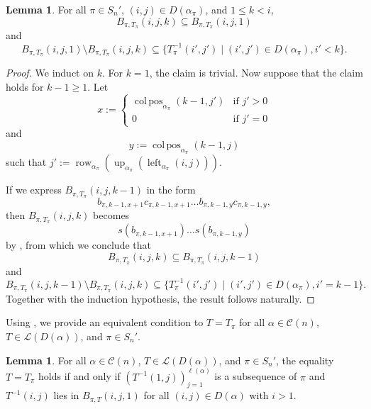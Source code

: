 \documentclass[12pt]{amsart}
\DeclareMathOperator{\colpos}{col\,pos}
\DeclareMathOperator{\leftof}{left}
\DeclareMathOperator{\row}{row}
\DeclareMathOperator{\upof}{up}
\theoremstyle{definition}
\newtheorem{lemma}[theorem]{Lemma}
\begin{document}
\begin{lemma}\label{lem:generalizedblockstuff}
For all $\pi\in S_n'$, $(i,j)\in D(\alpha_{\pi})$, and $1\le k<i$, 
\[B_{\pi,T_{\pi}}(i,j,k) \subseteq B_{\pi,T_{\pi}}(i,j,1)\]
and
\[B_{\pi,T_{\pi}}(i,j,1) \setminus B_{\pi,T_{\pi}}(i,j,k)\subseteq \{T_{\pi}^{-1}(i',j')\mid (i',j')\in D(\alpha_{\pi}), i'<k\}.\]
\end{lemma}
\begin{proof}
We induct on $k$. For $k=1$, the claim is trivial. Now suppose that the claim holds for $k-1\ge 1$. Let 
\[x := \begin{cases}\colpos_{\alpha_{\pi}}(k-1,j') &\text{if } j'>0 \\ 0 &\text{if } j'=0\end{cases}\]
and
\[y := \colpos_{\alpha_{\pi}}(k-1,j)\]
such that $j':=\row_{\alpha_{\pi}}(\upof_{\alpha_{\pi}}(\leftof_{\alpha_{\pi}}(i,j)))$.

If we express $B_{\pi,T_{\pi}}(i,j,k-1)$ in the form
\[b_{\pi,k-1,x+1}c_{\pi,k-1,x+1}\dots b_{\pi,k-1,y}c_{\pi,k-1,y},\]
then $B_{\pi,T_{\pi}}(i,j,k)$ becomes
\[s(b_{\pi,k-1,x+1})\dots s(b_{\pi,k-1,y})\]
by , from which we conclude that
\[B_{\pi,T_{\pi}}(i,j,k)\subseteq B_{\pi,T_{\pi}}(i,j,k-1)\]
and
\[B_{\pi,T_{\pi}}(i,j,k-1) \setminus B_{\pi,T_{\pi}}(i,j,k) \subseteq \{T_{\pi}^{-1}(i',j')\mid (i',j')\in D(\alpha_{\pi}), i'=k-1\}.\]
Together with the induction hypothesis, the result follows naturally. 
\end{proof}
Using , we provide an equivalent condition to $T=T_{\pi}$ for all $\alpha\in \mathcal{C}(n)$, $T\in \mathcal{L}(D(\alpha))$, and $\pi\in S_n'$.
\begin{lemma}\label{lem:newcrux}
For all $\alpha\in \mathcal{C}(n)$, $T\in \mathcal{L}(D(\alpha))$, and $\pi\in S_n'$, the equality $T=T_{\pi}$ holds if and only if $(T^{-1}(1,j))_{j=1}^{\ell(\alpha)}$ is a subsequence of $\pi$ and $T^{-1}(i,j)$ lies in $B_{\pi,T}(i,j,1)$ for all $(i,j)\in D(\alpha)$ with $i>1$.
\end{lemma}
\end{document}

